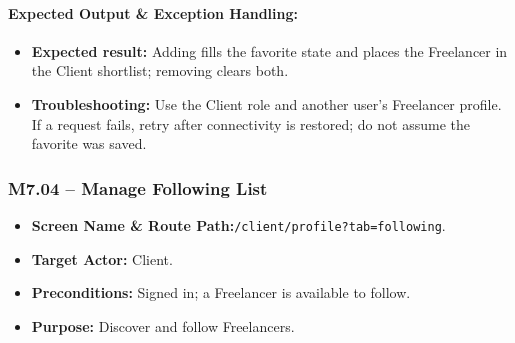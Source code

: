 \paragraph{Expected Output \& Exception Handling:}
\begin{itemize}[leftmargin=1.5em,itemsep=2pt]
  \item \textbf{Expected result:} Adding fills the favorite state and places the Freelancer in the Client shortlist; removing clears both.
  \item \textbf{Troubleshooting:} Use the Client role and another user's Freelancer profile. If a request fails, retry after connectivity is restored; do not assume the favorite was saved.
\end{itemize}

\newpage
\subsubsection{M7.04 -- Manage Following List}
\begin{itemize}[leftmargin=1.5em,itemsep=2pt]
  \item \textbf{Screen Name \& Route Path:}\newline \texttt{/client/profile?tab=following}.
  \item \textbf{Target Actor:} Client.
  \item \textbf{Preconditions:} Signed in; a Freelancer is available to follow.
  \item \textbf{Purpose:} Discover and follow Freelancers.
\end{itemize}
